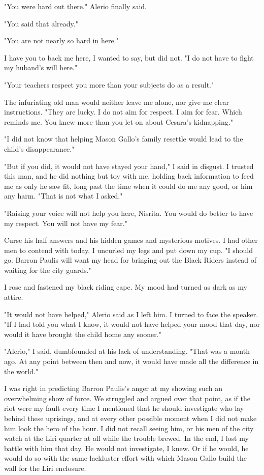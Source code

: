 \documentclass{article}
\begin{document}
"You were hard out there." Alerio finally said.

"You said that already."

"You are not nearly so hard in here."

I have you to back me here, I wanted to say, but did not. "I do not have to fight my huband's will here."

"Your teachers respect you more than your subjects do as a result."

The infuriating old man would neither leave me alone, nor give me clear instructions. "They are lucky. I do not aim for respect. I aim for fear. Which reminds me. You knew more than you let on about Cesara's kidnapping."

"I did not know that helping Mason Gallo's family resettle would lead to the child's disappearance."

"But if you did, it would not have stayed your hand," I said in disgust. I trusted this man, and he did nothing but toy with me, holding back information to feed me as only he saw fit, long past the time when it could do me any good, or him any harm. "That is not what I asked."

"Raising your voice will not help you here, Nisrita. You would do better to have my respect. You will not have my fear."

Curse his half answers and his hidden games and mysterious motives. I had other men to contend with today. I uncurled my legs and put down my cup. "I should go. Barron Paulis will want my head for bringing out the Black Riders instead of waiting for the city guards."

I rose and fastened my black riding cape. My mood had turned as dark as my attire. 

"It would not have helped," Alerio said as I left him. I turned to face the speaker. "If I had told you what I know, it would not have helped your mood that day, nor would it have brought the child home any sooner."

"Alerio," I said, dumbfounded at his lack of understanding. "That was a month ago. At any point between then and now, it would have made all the difference in the world."

\vspace{.5cm}

I was right in predicting Barron Paulis's anger at my showing such an overwhelming show of force. We struggled and argued over that point, as if the riot were my fault every time I mentioned that he should investigate who lay behind these uprisings, and at every other possible moment when I did not make him look the hero of the hour. I did not recall seeing him, or his men of the city watch at the Liri quarter at all while the trouble brewed. In the end, I lost my battle with him that day. He would not investigate, I knew. Or if he would, he would do so with the same lackluster effort with which Mason Gallo build the wall for the Liri enclosure.
\end{document}
